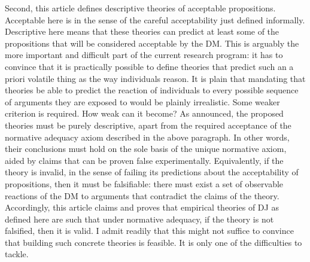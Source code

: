 \documentclass[version=last, pagesize, twoside=off, bibliography=totoc, DIV=calc, fontsize=12pt, a4paper, french, english]{scrartcl}
\begin{document}
Second, this article defines descriptive theories of acceptable propositions. Acceptable here is in the sense of the careful acceptability just defined informally. Descriptive here means that these theories can predict at least some of the propositions that will be considered acceptable by the \ac{DM}.
This is arguably the more important and difficult part of the current research program: it has to convince that it is practically possible to define theories that predict such an a priori volatile thing as the way individuals reason. It is plain that mandating that theories be able to predict the reaction of individuals to every possible sequence of arguments they are exposed to would be plainly irrealistic. Some weaker criterion is required. How weak can it become? As announced, the proposed theories must be purely descriptive, apart from the required acceptance of the normative adequacy axiom described in the above paragraph. In other words, their conclusions must hold on the sole basis of the unique normative axiom, aided by claims that can be proven false experimentally. Equivalently, if the theory is invalid, in the sense of failing its predictions about the acceptability of propositions, then it must be falsifiable: there must exist a set of observable reactions of the \ac{DM} to arguments that contradict the claims of the theory. Accordingly, this article claims and proves that empirical theories of \ac{DJ} as defined here are such that under normative adequacy, if the theory is not falsified, then it is valid. I admit readily that this might not suffice to convince that building such concrete theories is feasible. It is only one of the difficulties to tackle.
\end{document}
